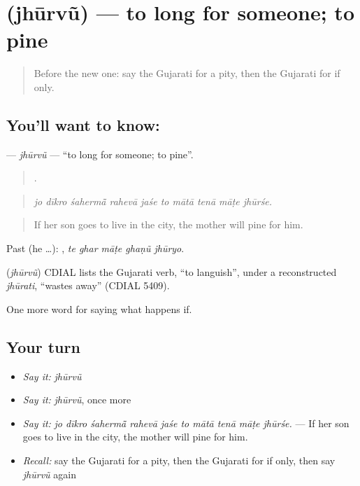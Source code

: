 \section[\texorpdfstring{\gu{ઝૂરવું} (jhūrvũ)}{ઝૂરવું (jhūrvũ)}]{ (jhūrvũ) — to long for someone; to pine}

\label{lesson:GU-C381-jhurvu}



\begin{quote}
Before the new one: say the Gujarati for a pity, then the Gujarati for if only.
\end{quote}

\subsection*{You'll want to know: }
\textbf{} — \emph{jhūrvũ} — \textquotedblleft{}to long for someone; to pine\textquotedblright{}.

\begin{quote}
         .
\end{quote}

\begin{quote}
\emph{jo dīkro śahermā̃ rahevā jaśe to mātā tenā māṭe jhūrśe.}
\end{quote}

\begin{quote}
If her son goes to live in the city, the mother will pine for him.
\end{quote}

Past (he …):     , \emph{te ghar māṭe ghaṇũ jhūryo}.

\begin{cousinweb}
\textbf{} (\emph{jhūrvũ}) CDIAL lists the Gujarati verb, \textquotedblleft{}to languish\textquotedblright{}, under a reconstructed \emph{jhūrati}, \textquotedblleft{}wastes away\textquotedblright{} (CDIAL 5409).
\end{cousinweb}

\begin{grammarlens}[title={What you've built}]
One more word for saying what happens if.
\end{grammarlens}

\subsection*{Your turn}
\begin{itemize}
\raggedright
  \item \emph{Say it:} \emph{jhūrvũ}
  \item \emph{Say it:} \emph{jhūrvũ}, once more
  \item \emph{Say it:} \emph{jo dīkro śahermā̃ rahevā jaśe to mātā tenā māṭe jhūrśe.} — If her son goes to live in the city, the mother will pine for him.
  \item \emph{Recall:} say the Gujarati for a pity, then the Gujarati for if only, then say \emph{jhūrvũ} again
\end{itemize}

